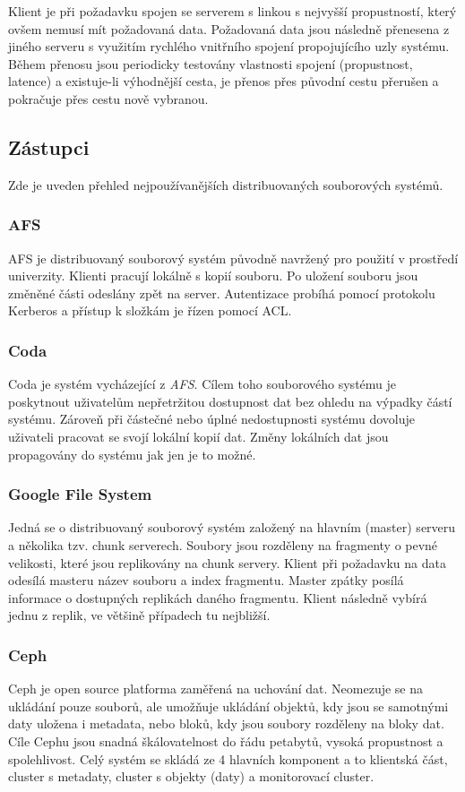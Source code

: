 \documentclass[czech,DP]{thesiskiv}
\begin{document}
Klient je při požadavku spojen se serverem s linkou s nejvyšší propustností, který ovšem nemusí mít požadovaná data. Požadovaná data jsou následně přenesena z jiného serveru s využitím rychlého vnitřního spojení propojujícího uzly systému. Během přenosu jsou periodicky testovány vlastnosti spojení (propustnost, latence) a existuje-li výhodnější cesta, je přenos přes původní cestu přerušen a pokračuje přes cestu nově vybranou.

\subsection{Zástupci}

Zde je uveden přehled nejpoužívanějších distribuovaných souborových systémů.

\subsubsection*{AFS} 
AFS je distribuovaný souborový systém původně navržený pro použití v prostředí univerzity. Klienti pracují lokálně s kopií souboru. Po uložení souboru jsou změněné části odeslány zpět na server. Autentizace probíhá pomocí protokolu Kerberos a přístup k složkám je řízen pomocí ACL.

\subsubsection*{Coda}
Coda je systém vycházející z \textit{AFS}. Cílem toho souborového systému je poskytnout uživatelům nepřetržitou dostupnost dat bez ohledu na výpadky částí systému. Zároveň při částečné nebo úplné nedostupnosti systému dovoluje uživateli pracovat se svojí lokální kopií dat. Změny lokálních dat jsou propagovány do systému jak jen je to možné.

\subsubsection*{Google File System} 
Jedná se o distribuovaný souborový systém založený na hlavním (master) serveru a několika tzv. chunk serverech. Soubory jsou rozděleny na fragmenty o pevné velikosti, které jsou replikovány na chunk servery. Klient při požadavku na data odesílá masteru název souboru a index fragmentu. Master zpátky posílá informace o dostupných replikách daného fragmentu. Klient následně vybírá jednu z replik, ve většině případech tu nejbližší.

\subsubsection*{Ceph} 
Ceph je open source platforma zaměřená na uchování dat. Neomezuje se na ukládání pouze souborů, ale umožňuje ukládání objektů, kdy jsou se samotnými daty uložena i metadata, nebo bloků, kdy jsou soubory rozděleny na bloky dat. Cíle Cephu jsou snadná škálovatelnost do řádu petabytů, vysoká propustnost a spolehlivost. Celý systém se skládá ze 4 hlavních komponent a to klientská část, cluster s metadaty, cluster s objekty (daty) a monitorovací cluster. 
\end{document}
